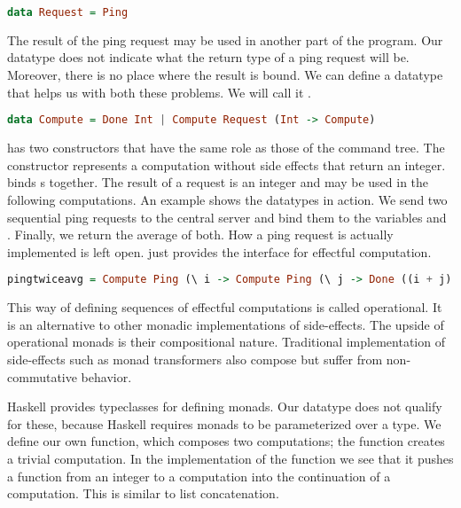 \begin{lstlisting}[language=Haskell]
data Request = Ping
\end{lstlisting}

The result of the ping request may be used in another part of the program. Our  datatype does not indicate what the return type of a ping request will be. Moreover, there is no place where the result is bound. We can define a datatype that helps us with both these problems. We will call it .

\begin{lstlisting}[language=Haskell]
data Compute = Done Int | Compute Request (Int -> Compute)
\end{lstlisting}

 has two constructors that have the same role as those of the command tree. The  constructor represents a computation without side effects that return an integer.  binds s together. The result of a request is an integer and may be used in the following computations. An example shows the datatypes in action. We send two sequential ping requests to the central server and bind them to the variables  and . Finally, we return the average of both. How a ping request is actually implemented is left open.  just provides the interface for effectful computation.

\begin{lstlisting}[language=Haskell]
pingtwiceavg = Compute Ping (\ i -> Compute Ping (\ j -> Done ((i + j) `div` 2)))
\end{lstlisting}

This way of defining sequences of effectful computations is called operational\autocite{operationalmonad}. It is an alternative to other monadic implementations of side-effects. The upside of operational monads is their compositional nature. Traditional implementation of side-effects such as monad transformers\autocite{DBLP:conf/popl/LiangHJ95} also compose but suffer from non-commutative behavior.

Haskell provides typeclasses for defining monads. Our  datatype does not qualify for these, because Haskell requires monads to be parameterized over a type. We define our own  function, which composes two computations; the  function creates a trivial computation. In the implementation of the  function we see that it pushes a function from an integer to a computation into the continuation of a computation. This is similar to list concatenation.

